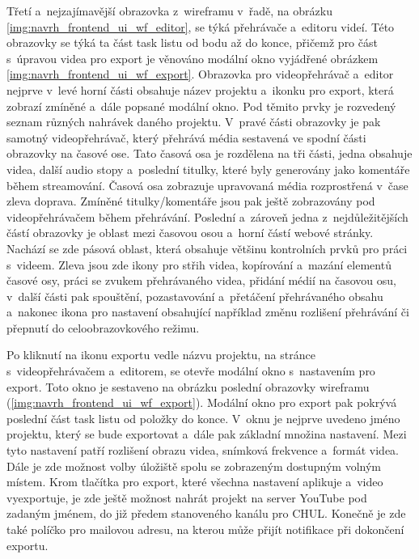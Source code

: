 \documentclass[thesis=M,czech]{FITthesis}[2012/06/26]
\begin{document}
Třetí a~nejzajímavější obrazovka z~wireframu v~řadě, na obrázku \ref{img:navrh_frontend_ui_wf_editor}, se týká přehrávače a~editoru videí. Této obrazovky se týká ta část task listu od bodu  až do konce, přičemž pro část s~úpravou videa pro export je věnováno modální okno vyjádřené obrázkem \ref{img:navrh_frontend_ui_wf_export}. Obrazovka pro videopřehrávač a~editor nejprve v~levé horní části obsahuje název projektu a~ikonku pro export, která zobrazí zmíněné a~dále popsané modální okno. Pod těmito prvky je rozvedený seznam různých nahrávek daného projektu. V~pravé části obrazovky je pak samotný videopřehrávač, který přehrává média sestavená ve spodní části obrazovky na časové ose. Tato časová osa je rozdělena na tři části, jedna obsahuje videa, další audio stopy a~poslední titulky, které byly generovány jako komentáře během streamování. Časová osa zobrazuje upravovaná média rozprostřená v~čase zleva doprava. Zmíněné titulky/komentáře jsou pak ještě zobrazovány pod videopřehrávačem během přehrávání. Poslední a~zároveň jedna z~nejdůležitějších částí obrazovky je oblast mezi časovou osou a~horní částí webové stránky. Nachází se zde pásová oblast, která obsahuje většinu kontrolních prvků pro práci s~videem. Zleva jsou zde ikony pro střih videa, kopírování a~mazání elementů časové osy, práci se zvukem přehrávaného videa, přidání médií na časovou osu, v~další části pak spouštění, pozastavování a~přetáčení přehrávaného obsahu a~nakonec ikona pro nastavení obsahující například změnu rozlišení přehrávání či přepnutí do celoobrazovkového režimu.

	Po kliknutí na ikonu exportu vedle názvu projektu, na stránce s~videopřehrávačem a~editorem, se otevře modální okno s~nastavením pro export. Toto okno je sestaveno na obrázku poslední obrazovky wireframu (\ref{img:navrh_frontend_ui_wf_export}). Modální okno pro export pak pokrývá poslední část task listu od položky  do konce. V~oknu je nejprve uvedeno jméno projektu, který se bude exportovat a~dále pak základní množina nastavení. Mezi tyto nastavení patří rozlišení obrazu videa, snímková frekvence a~formát videa. Dále je zde možnost volby úložiště spolu se zobrazeným dostupným volným místem. Krom tlačítka pro export, které všechna nastavení aplikuje a~video vyexportuje, je zde ještě možnost nahrát projekt na server YouTube pod zadaným jménem, do již předem stanoveného kanálu pro CHUL. Konečně je zde také políčko pro mailovou adresu, na kterou může přijít notifikace při dokončení exportu.
\end{document}
